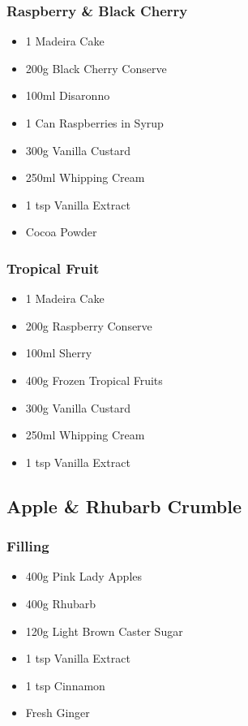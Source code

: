 \documentclass[11pt, english]{article}
\begin{document}
		\subsubsection*{Raspberry \& Black Cherry}

	\begin{itemize}
        \setlength\itemsep{0cm}
                \item 1 Madeira Cake
		\item 200g Black Cherry Conserve
		\item 100ml Disaronno
		\item 1 Can Raspberries in Syrup
		\item 300g Vanilla Custard
		\item 250ml Whipping Cream
		\item 1 tsp Vanilla Extract
		\item Cocoa Powder
        \end{itemize}		

		\subsubsection*{Tropical Fruit}

	\begin{itemize}
        \setlength\itemsep{0cm}
                \item 1 Madeira Cake
		\item 200g Raspberry Conserve
		\item 100ml Sherry
		\item 400g Frozen Tropical Fruits
		\item 300g Vanilla Custard
		\item 250ml Whipping Cream
		\item 1 tsp Vanilla Extract
        \end{itemize}

\newpage

	\subsection{Apple \& Rhubarb Crumble}

		\subsubsection*{Filling}

	\begin{itemize}
        \setlength\itemsep{0cm}
                \item 400g Pink Lady Apples
		\item 400g Rhubarb
		\item 120g Light Brown Caster Sugar
		\item 1 tsp Vanilla Extract
		\item 1 tsp Cinnamon
		\item Fresh Ginger
        \end{itemize}
\end{document}
